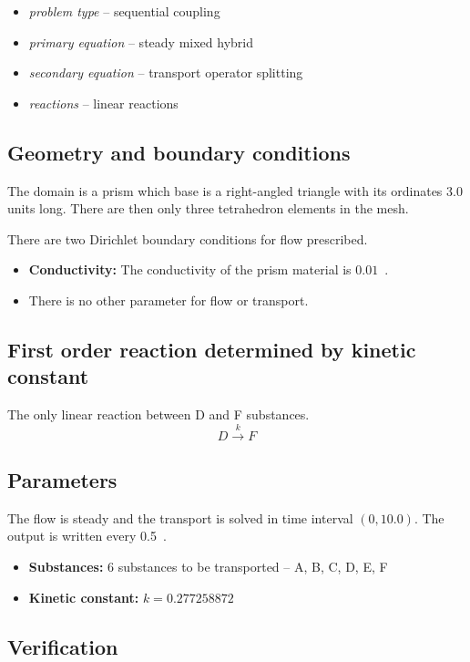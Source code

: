 \begin{itemize} 
    \item \emph{problem type} -- sequential coupling
    \item \emph{primary equation} -- steady mixed hybrid
    \item \emph{secondary equation} -- transport operator splitting
    \item \emph{reactions} -- linear reactions
  \end{itemize}

\subsection*{Geometry and boundary conditions}
The domain is a prism which base is a right-angled triangle with its ordinates 3.0 units long. There are then only three tetrahedron elements in the mesh.

There are two Dirichlet boundary conditions for flow prescribed.

\begin{itemize}
  \item \textbf{Conductivity:} The conductivity of the prism material is $0.01$~. 
  \item There is no other parameter for flow or transport.
\end{itemize}



\subsection{First order reaction determined by kinetic constant}
The only linear reaction between D and F substances.
\[
D\xrightarrow{k}F
\]

\subsection*{Parameters}
The flow is steady and the transport is solved in time interval $(0,10.0)$. The output is written every 0.5~.  
\begin{itemize}
  \item \textbf{Substances:} 6 substances to be transported -- A, B, C, D, E, F
  \item \textbf{Kinetic constant:} $k = 0.277258872$
\end{itemize}

\subsection*{Verification}

